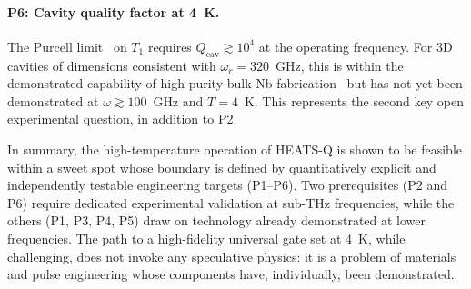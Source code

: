 \paragraph{P6: Cavity quality factor at 4~K.}
The Purcell limit~\cite{Schuster2005PRL} on $T_1$ requires
$Q_{\text{cav}} \gtrsim 10^4$ at the operating frequency. For 3D
cavities of dimensions consistent with $\omega_r\!=\!320$~GHz, this is within
the demonstrated capability of high-purity bulk-Nb
fabrication~\cite{Romanenko2020} but has not yet been demonstrated at
$\omega \gtrsim 100$~GHz and $T = 4$~K. This represents the second
key open experimental question, in addition to P2.

\medskip

In summary, the high-temperature operation of HEATS-Q is shown to be feasible
within a sweet spot whose boundary is defined by quantitatively explicit and
independently testable engineering targets (P1--P6). Two prerequisites (P2 and
P6) require dedicated experimental validation at sub-THz frequencies, while
the others (P1, P3, P4, P5) draw on technology already demonstrated at lower
frequencies. The path to a high-fidelity universal gate set at 4~K, while
challenging, does not invoke any speculative physics: it is a problem of
materials and pulse engineering whose components have, individually, been
demonstrated.
